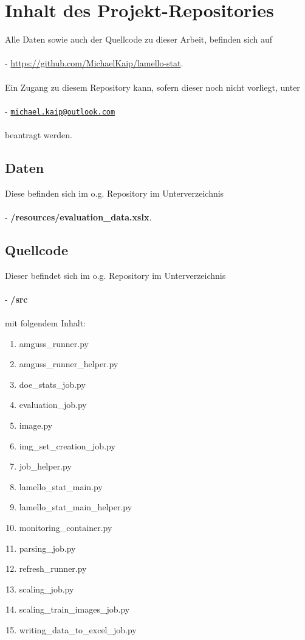 \documentclass[
fontsize=10pt, 
listof = totoc,
parskip = half	
]{report}
\begin{document}
\newpage

\appendix
\chapter{Inhalt des Projekt-Repositories}

Alle Daten sowie auch der Quellcode zu dieser Arbeit, befinden sich auf
\\\\ 
- \url{https://github.com/MichaelKaip/lamello-stat}.
\\\\
Ein Zugang zu diesem Repository kann, sofern dieser noch nicht vorliegt, unter
\\\\ 
- \href{mailto:michael.kaip@outlook.com}{\nolinkurl{michael.kaip@outlook.com}} 
\\\\
beantragt werden.

\section{Daten}
Diese befinden sich im o.g. Repository im Unterverzeichnis
\\\\ 
- \textbf{/resources/evaluation\_data.xslx}.

\section{Quellcode}
Dieser befindet sich im o.g. Repository im Unterverzeichnis
\\\\ 
- \textbf{/src}
\\\\
mit folgendem Inhalt:
\begin{enumerate}\bfseries
	\item amguss\_runner.py
	\item amguss\_runner\_helper.py
	\item doe\_stats\_job.py
	\item evaluation\_job.py
	\item image.py
	\item img\_set\_creation\_job.py
	\item job\_helper.py
	\item lamello\_stat\_main.py
	\item lamello\_stat\_main\_helper.py
	\item monitoring\_container.py
	\item parsing\_job.py
	\item refresh\_runner.py
	\item scaling\_job.py
	\item scaling\_train\_images\_job.py
	\item writing\_data\_to\_excel\_job.py
\end{enumerate}
\end{document}
